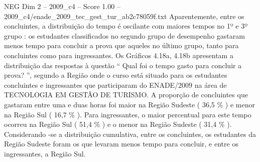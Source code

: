 \begin{textsample}{NEG Dim 2 – 2009\_c4 – Score 1.00 – 2009\_c4/enade\_2009\_tec\_gest\_tur\_ab2c78059f.txt}
Aparentemente, entre os concluintes, a distribuição do tempo é oscilante com maiores tempos no 1º e 3º grupo : os estudantes classificados no segundo grupo de desempenho gastaram menos tempo para concluir a prova que aqueles no último grupo, tanto para concluintes como para ingressantes.
Os Gráficos 4.18a, 4.18b apresentam a distribuição das respostas à questão “ Qual foi o tempo gasto para concluir a prova? ”, segundo a Região onde o curso está situado para os estudantes concluintes e ingressantes que participaram do ENADE/2009 na área de TECNOLOGIA EM GESTÃO DE TURISMO.
A proporção de concluintes que gastaram entre uma e duas horas foi maior na Região Sudeste ( 36,5 \% ) e menor na Região Sul ( 16,7 \% ).
Para ingressantes, o maior percentual para este tempo ocorreu na Região Sul ( 51,4 \% ) e o menor na Região Sudeste ( 31,4 \% ).
Considerando -se a distribuição cumulativa, entre os concluintes, os estudantes da Região Sudeste foram os que levaram menos tempo para concluir, e entre os ingressantes, a Região Sul.

\end{textsample}
